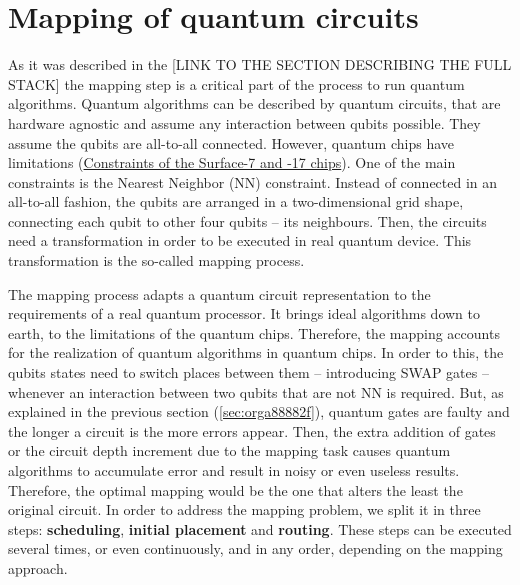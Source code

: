 \section{Mapping of quantum circuits}
\label{sec:org1e1811a}
As it was described in the [LINK TO THE SECTION DESCRIBING THE FULL STACK] the mapping step is a critical part of the process to run quantum algorithms.
Quantum algorithms can be described by quantum circuits, that are hardware agnostic and assume any interaction between qubits possible.
They assume the qubits are all-to-all connected.
However, quantum chips have limitations (\href{chapter-3.org}{Constraints of the Surface-7 and -17 chips}).
One of the main constraints is the Nearest Neighbor (NN) constraint.
Instead of connected in an all-to-all fashion, the qubits are arranged in a two-dimensional grid shape, connecting each qubit to other four qubits -- its neighbours.
Then, the circuits need a transformation in order to be executed in real quantum device.
This transformation is the so-called mapping process.

The mapping process adapts a quantum circuit representation to the requirements of a real quantum processor.
It brings ideal algorithms down to earth, to the limitations of the quantum chips.
Therefore, the mapping accounts for the realization of quantum algorithms in quantum chips.
In order to this, the qubits states need to switch places between them -- introducing SWAP gates -- whenever an interaction between two qubits that are not NN is required. 
But, as explained in the previous section (\ref{sec:orga88882f}), quantum gates are faulty and the longer a circuit is the more errors appear.
Then, the extra addition of gates or the circuit depth increment due to the mapping task causes quantum algorithms to accumulate error and result in noisy or even useless results.
Therefore, the optimal mapping would be the one that alters the least the original circuit.
In order to address the mapping problem, we split it in three steps: \textbf{scheduling}, \textbf{initial placement} and \textbf{routing}.
These steps can be executed several times, or even continuously, and in any order, depending on the mapping approach.

